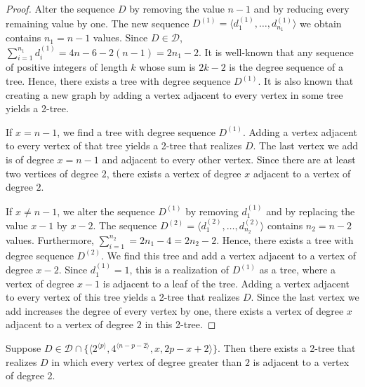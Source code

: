 \documentclass[lotsofwhite,charterfonts]{patmorin}
\newcommand{\rep}[1]{^{\langle#1\rangle}}
\begin{document}
\begin{proof} 
Alter the sequence $D$ by removing the value $n-1$ and by reducing
every remaining value by one. The new sequence $D^{(1)} = \langle
d_1^{(1)},\ldots,d_{n_1}^{(1)}\rangle$ we obtain contains $n_1 = n-1$
values.  Since $D\in \mathcal{D}$, $\sum_{i=1}^{n_1} d^{(1)}_i= 4n-6 -
2(n-1) = 2n_1-2$. It is well-known that any sequence of positive
integers of length $k$ whose sum is $2k-2$ is the degree sequence of a
tree. Hence, there exists a tree with degree sequence $D^{(1)}$. It is
also known that creating a new graph by adding a vertex adjacent to
every vertex in some tree yields a 2-tree.

If $x = n-1$, we find a tree with degree sequence $D^{(1)}$. Adding a
vertex adjacent to every vertex of that tree yields a 2-tree that
realizes $D$. The last vertex we add is of degree $x = n-1$ and
adjacent to every other vertex. Since there are at least two vertices
of degree $2$, there exists a vertex of degree $x$ adjacent to a
vertex of degree $2$.

If $x \neq n-1$, we alter the sequence $D^{(1)}$ by removing
$d_1^{(1)}$ and by replacing the value $x-1$ by $x-2$. The sequence
$D^{(2)} = \langle d_1^{(2)},\ldots,d_{n_2}^{(2)}\rangle$ contains
$n_2 = n-2$ values. Furthermore, $\sum_{i=1}^{n_2} = 2n_1 - 4 = 2n_2 -
2$. Hence, there exists a tree with degree sequence $D^{(2)}$. We find
this tree and add a vertex adjacent to a vertex of degree $x-2$. Since
$d_1^{(1)} = 1$, this is a realization of $D^{(1)}$ as a tree, where a
vertex of degree $x-1$ is adjacent to a leaf of the tree. Adding a
vertex adjacent to every vertex of this tree yields a 2-tree that
realizes $D$. Since the last vertex we add increases the degree of
every vertex by one, there exists a vertex of degree $x$ adjacent to a
vertex of degree $2$ in this 2-tree.
\end{proof}

\begin{lem}
Suppose $D\in \mathcal{D}\cap \{\langle
2\rep{p},4\rep{n-p-2},x,2p-x+2\rangle\}$.  Then there exists a 2-tree
that realizes $D$ in which every vertex of degree greater than $2$ is
adjacent to a vertex of degree 2.
\end{lem}
\end{document}
